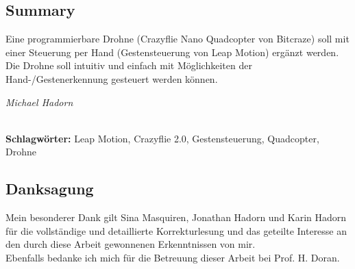 
\subsection*{Summary}
Eine programmierbare Drohne (Crazyflie Nano Quadcopter von Bitcraze) soll mit einer Steuerung per Hand (Gestensteuerung von Leap Motion) ergänzt werden. Die Drohne soll intuitiv und einfach mit Möglichkeiten der Hand-/Gestenerkennung gesteuert werden können.
\begin{flushright}
	\textit{Michael Hadorn}	
\end{flushright}

%
\mbox{}\\[0.5\baselineskip]\noindent
\textbf{Schlagwörter:} 
Leap Motion, Crazyflie 2.0, Gestensteuerung, Quadcopter, Drohne

\vfill
\subsection*{Danksagung}
Mein besonderer Dank gilt Sina Masquiren, Jonathan Hadorn und Karin Hadorn für die vollständige und detaillierte Korrekturlesung und das geteilte Interesse an den durch diese Arbeit gewonnenen Erkenntnissen von mir.\\
Ebenfalls bedanke ich mich für die Betreuung dieser Arbeit bei Prof. H. Doran.